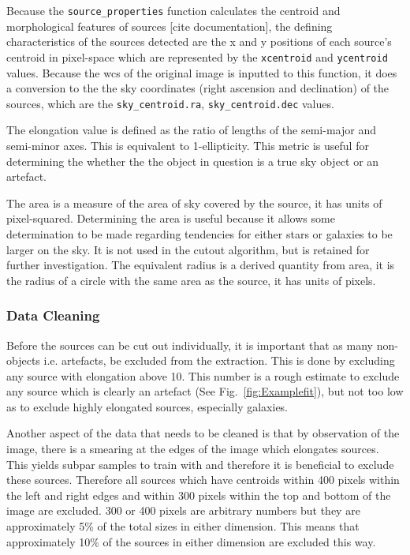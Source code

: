 \documentclass[a4paper,fleqn,usenatbib]{mnras}
\begin{document}
Because the \texttt{source\_properties} function calculates the centroid and morphological features of sources [cite documentation], the defining characteristics of the sources detected are the x and y positions of each source's centroid in pixel-space which are represented by the \texttt{xcentroid} and \texttt{ycentroid} values. Because the wcs of the original image is inputted to this function, it does a conversion to the the sky coordinates (right ascension and declination) of the sources, which are the \texttt{sky\_centroid.ra}, \texttt{sky\_centroid.dec} values. 

The elongation value is defined as the ratio of lengths of the semi-major and semi-minor axes. This is equivalent to 1-ellipticity. This metric is useful for determining the whether the the object in question is a true sky object or an artefact. 

The area is a measure of the area of sky covered by the source, it has units of pixel-squared. Determining the area is useful because it allows some determination to be made regarding tendencies for either stars or galaxies to be larger on the sky. It is not used in the cutout algorithm, but is retained for further investigation. The equivalent radius is a derived quantity from area, it is the radius of a circle with the same area as the source, it has units of pixels. 





\subsubsection{Data Cleaning}
Before the sources can be cut out individually, it is important that as many non-objects i.e. artefacts, be excluded from the extraction. This is done by excluding any source with elongation above 10. This number is a rough estimate to exclude any source which is clearly an artefact (See Fig.~\ref{fig:Examplefit}), but not too low as to exclude highly elongated sources, especially galaxies. 

Another aspect of the data that needs to be cleaned is that by observation of the image, there is a smearing at the edges of the image which elongates sources. This yields subpar samples to train with and therefore it is beneficial to exclude these sources. Therefore all sources which have centroids within 400 pixels within the left and right edges and within 300 pixels within the top and bottom of the image are excluded. 300 or 400 pixels are arbitrary numbers but they are approximately 5\% of the total sizes in either dimension. This means that approximately 10\% of the sources in either dimension are excluded this way. 
\end{document}
